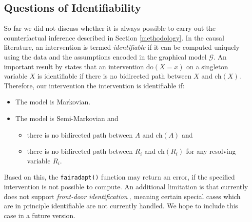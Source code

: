 \documentclass[
  nojss]{jss}
\providecommand{\tightlist}{%
  \setlength{\itemsep}{0pt}\setlength{\parskip}{0pt}}
\begin{document}
\hypertarget{questions-of-identifiability}{%
\subsection{Questions of
Identifiability}\label{questions-of-identifiability}}

So far we did not discuss whether it is always possible to carry out the
counterfactual inference described in Section \ref{methodology}. In the
causal literature, an intervention is termed \emph{identifiable} if it
can be computed uniquely using the data and the assumptions encoded in
the graphical model \(\mathcal{G}\). An important result by
\cite{tian2002general} states that an intervention do\((X = x)\) on a
singleton variable \(X\) is identifiable if there is no bidirected path
between \(X\) and \(\mathrm{ch}(X)\). Therefore, our intervention the
intervention is identifiable if:

\begin{itemize}
\tightlist
\item
  The model is Markovian.
\item
  The model is Semi-Markovian and

  \begin{itemize}
  \tightlist
  \item
    there is no bidirected path between \(A\) and \(\mathrm{ch}(A)\) and
  \item
    there is no bidirected path between \(R_i\) and \(\mathrm{ch}(R_i)\)
    for any resolving variable \(R_i\).
  \end{itemize}
\end{itemize}

Based on this, the \texttt{fairadapt()} function may return an error, if
the specified intervention is not possible to compute. An additional
limitation is that  currently does not support
\emph{front-door identification} \citep[Chapter~3]{pearl2009causality},
meaning certain special cases which are in principle identifiable are
not currently handled. We hope to include this case in a future version.


\end{document}
